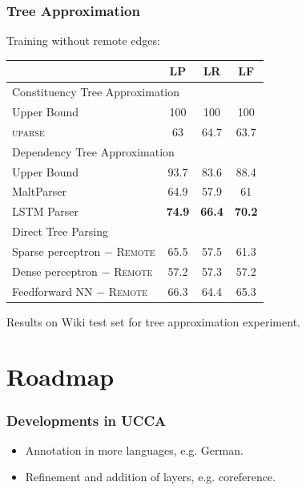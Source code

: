 \documentclass[t,handout,xcolor={svgnames}]{beamer}
\begin{document}
\begin{frame}
\frametitle{Tree Approximation}
Training without remote edges:

\begin{center}
	\begin{tabular}{l|ccc}
	& \textbf{LP} & \textbf{LR} & \textbf{LF} \\
	\hline
	\multicolumn{4}{l}{\rule{0pt}{2ex} \footnotesize Constituency Tree Approximation} \\
	Upper Bound & 100 & 100 & 100 \vspace{.1cm} \\
	\textsc{uparse} & 63 & 64.7 & 63.7 \\
	\hline
	\multicolumn{4}{l}{\rule{0pt}{2ex} \footnotesize Dependency Tree Approximation} \\
	Upper Bound & 93.7 & 83.6 & 88.4 \vspace{.1cm} \\
	MaltParser & 64.9 & 57.9 & 61 \\
	LSTM Parser & {\bf 74.9} & {\bf 66.4} & {\bf 70.2} \\
	\hline
	\multicolumn{4}{l}{\rule{0pt}{2ex} \footnotesize Direct Tree Parsing} \\
	Sparse perceptron $-$ \textsc{Remote} & 65.5 & 57.5 & 61.3 \\
	Dense perceptron $-$ \textsc{Remote} & 57.2 & 57.3 & 57.2 \\
	Feedforward NN $-$ \textsc{Remote} & 66.3 & 64.4 & 65.3
	\end{tabular}
\end{center}

Results on Wiki test set for tree approximation experiment.
\end{frame}


\section[]{Roadmap}

\begin{frame}
\frametitle{Developments in UCCA}
\begin{itemize}
 \item Annotation in more languages, e.g. German.
 \item Refinement and addition of layers, e.g. coreference.
\end{itemize}
\end{frame}
\end{document}
